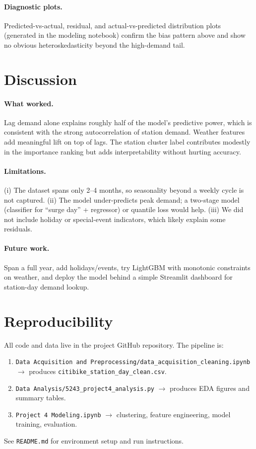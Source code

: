 \documentclass[11pt]{article}
\begin{document}
\paragraph{Diagnostic plots.}
Predicted-vs-actual, residual, and actual-vs-predicted distribution plots
(generated in the modeling notebook) confirm the bias pattern above and show
no obvious heteroskedasticity beyond the high-demand tail.

\section{Discussion}

\paragraph{What worked.}
Lag demand alone explains roughly half of the model's predictive power, which
is consistent with the strong autocorrelation of station demand. Weather
features add meaningful lift on top of lags. The station cluster label
contributes modestly in the importance ranking but adds interpretability
without hurting accuracy.

\paragraph{Limitations.}
(i) The dataset spans only 2--4 months, so seasonality beyond a weekly cycle
is not captured. (ii) The model under-predicts peak demand; a two-stage model
(classifier for ``surge day'' + regressor) or quantile loss would help.
(iii) We did not include holiday or special-event indicators, which likely
explain some residuals.

\paragraph{Future work.}
Span a full year, add holidays/events, try LightGBM with monotonic constraints
on weather, and deploy the model behind a simple Streamlit dashboard for
station-day demand lookup.

\section{Reproducibility}

All code and data live in the project GitHub repository. The pipeline is:
\begin{enumerate}[leftmargin=1.6em]
  \item \texttt{Data Acquisition and Preprocessing/data\_acquisition\_cleaning.ipynb}
        $\to$ produces \texttt{citibike\_station\_day\_clean.csv}.
  \item \texttt{Data Analysis/5243\_project4\_analysis.py}
        $\to$ produces EDA figures and summary tables.
  \item \texttt{Project 4 Modeling.ipynb}
        $\to$ clustering, feature engineering, model training, evaluation.
\end{enumerate}
See \texttt{README.md} for environment setup and run instructions.
\end{document}

